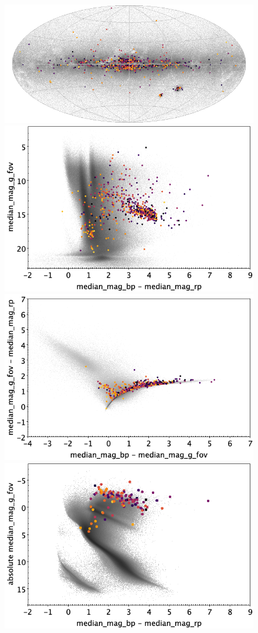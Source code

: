 \documentclass[longauth]{aa}
\begin{document}
\begin{appendix}
\begin{figure}
\centering
{}
\includegraphics[width=0.6\hsize]{figures/appendix/SYST_cls_sky.png} 
 \\ %
\vspace{4mm}
 \includegraphics[width=0.45\hsize]{figures/appendix/SYST_cls_cm.png}  %
\hspace{2mm}
 \includegraphics[width=0.45\hsize]{figures/appendix/SYST_cls_cc.png} \\ %
\vspace{4mm}
 \includegraphics[width=0.45\hsize]{figures/appendix/SYST_cls_cam.png}  %

\end{figure}
\end{appendix}
\end{document}
